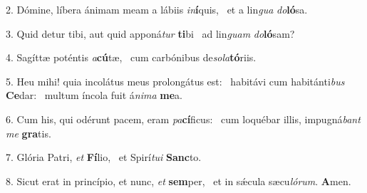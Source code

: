 2. Dómine, líbera ánimam meam a lábiis \textit{in}\textbf{í}quis, \ast\  et a lin\textit{gua} \textit{do}\textbf{ló}sa.\

3. Quid detur tibi, aut quid apponá\textit{tur} \textbf{ti}bi \ast\  ad lin\textit{guam} \textit{do}\textbf{ló}sam?\

4. Sagíttæ poténtis \textit{a}\textbf{cú}tæ, \ast\  cum carbónibus de\textit{so}\textit{la}\textbf{tó}riis.\

5. Heu mihi! quia incolátus meus prolongátus est: \dag\  habitávi cum habitánti\textit{bus} \textbf{Ce}dar: \ast\  multum íncola fuit á\textit{ni}\textit{ma} \textbf{me}a.\

6. Cum his, qui odérunt pacem, eram \textit{pa}\textbf{cí}ficus: \ast\  cum loquébar illis, impugná\textit{bant} \textit{me} \textbf{gra}tis.\

7. Glória Patri, \textit{et} \textbf{Fí}lio, \ast\  et Spirí\textit{tu}\textit{i} \textbf{Sanc}to.\

8. Sicut erat in princípio, et nunc, \textit{et} \textbf{sem}per, \ast\  et in sǽcula sæcu\textit{ló}\textit{rum}. \textbf{A}men.\

